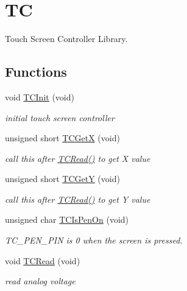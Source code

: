 \hypertarget{group___t_c}{}\section{T\+C}
\label{group___t_c}


Touch Screen Controller Library.  


\subsection*{Functions}
\begin{DoxyCompactItemize}
\item 
void \hyperlink{group___t_c_gaed3494e4fc9d42d7fb78b48c65d6582d}{T\+C\+Init} (void)
\begin{DoxyCompactList}\small\item\em initial touch screen controller \end{DoxyCompactList}\item 
unsigned short \hyperlink{group___t_c_gad8f951414d812509bbddccf70d190ad4}{T\+C\+Get\+X} (void)
\begin{DoxyCompactList}\small\item\em call this after \hyperlink{group___t_c_ga4f0731336c332b00c2efc02470a6862a}{T\+C\+Read()} to get X value \end{DoxyCompactList}\item 
unsigned short \hyperlink{group___t_c_gaee0209bfc5eebc394ecd7983e6332fd5}{T\+C\+Get\+Y} (void)
\begin{DoxyCompactList}\small\item\em call this after \hyperlink{group___t_c_ga4f0731336c332b00c2efc02470a6862a}{T\+C\+Read()} to get Y value \end{DoxyCompactList}\item 
unsigned char \hyperlink{group___t_c_ga2f124701c2fb0aa1e2123192037b7808}{T\+C\+Is\+Pen\+On} (void)
\begin{DoxyCompactList}\small\item\em T\+C\+\_\+\+P\+E\+N\+\_\+\+P\+I\+N is 0 when the screen is pressed. \end{DoxyCompactList}\item 
void \hyperlink{group___t_c_ga4f0731336c332b00c2efc02470a6862a}{T\+C\+Read} (void)
\begin{DoxyCompactList}\small\item\em read analog voltage \end{DoxyCompactList}\end{DoxyCompactItemize}


